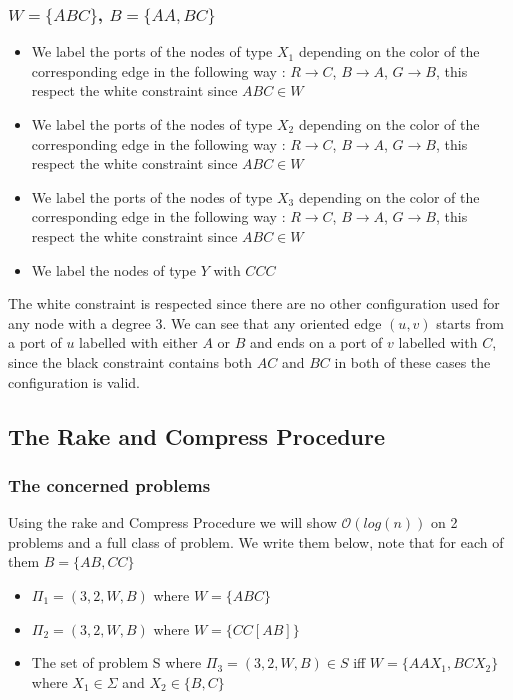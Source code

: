 \subsubsection[(W = (ABC), B = (AA,BC)]{$W = \{ABC\}$, $B = \{AA, BC\}$}
\begin{itemize}
    \item We label the ports of the nodes of type $X_1$ depending on the color of the corresponding edge in the following way : $R \rightarrow C$, $B \rightarrow A$, $G \rightarrow B$, this respect the white constraint since $ABC\in W$
    \item We label the ports of the nodes of type $X_2$ depending on the color of the corresponding edge in the following way : $R \rightarrow C$, $B \rightarrow A$, $G \rightarrow B$, this respect the white constraint since $ABC\in W$
    \item We label the ports of the nodes of type $X_3$ depending on the color of the corresponding edge in the following way : $R \rightarrow C$, $B \rightarrow A$, $G \rightarrow B$, this respect the white constraint since $ABC\in W$
    \item We label the nodes of type $Y$ with $CCC$
\end{itemize}
The white constraint is respected since there are no other configuration used for any node with a degree 3.
We can see that any oriented edge $(u,v)$ starts from a port of $u$ labelled with either $A$ or $B$ and ends on a port of $v$ labelled with $C$, since the black constraint contains both $AC$ and $BC$ in both of these cases the configuration is valid.



\subsection{The Rake and Compress Procedure}
\subsubsection{The concerned problems}
Using the rake and Compress Procedure we will show $\mathcal{O}(log(n))$ on 2 problems and a full class of problem.
We write them below, note that for each of them $B=\{AB,CC\}$
\begin{itemize}
    \item $\Pi_1 = (3,2,W,B)$ where $W = \{ABC\}$
    \item $\Pi_2 = (3,2,W,B)$ where $W = \{CC[AB]\}$
    \item The set of problem S where $\Pi_3 = (3,2,W,B)\in S$ iff $W = \{AAX_1,BCX_2\}$ where $X_1\in \Sigma$ and $X_2\in \{B,C\}$
\end{itemize}
